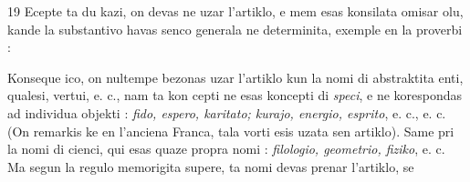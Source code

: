 \begin{VUpage}[23]{19}
Ecepte ta du kazi, on devas ne uzar l'artiklo, e mem esas\nl
konsilata omisar olu, kande la substantivo havas senco\nl
generala ne determinita, exemple en la proverbi : \nl
{}

Konseque ico, on nultempe bezonas uzar l'artiklo kun la\nl
nomi di abstraktita enti, qualesi, vertui, e. c., nam ta kon\cc
cepti ne esas koncepti di \textit{speci}, e ne korespondas ad individua\nl
objekti : \textit{fido, espero, karitato; kurajo, energio, esprito}, e. c.,\nl
e. c. (On remarkis ke en l'anciena Franca, tala vorti esis uzata\nl
sen artiklo). Same pri la nomi di cienci, qui esas quaze\nl
propra nomi : \textit{filologio, geometrio, fiziko}, e. c. Ma segun la\nl
regulo memorigita supere, ta nomi devas prenar l'artiklo, se
\parplein
\end{VUpage}

